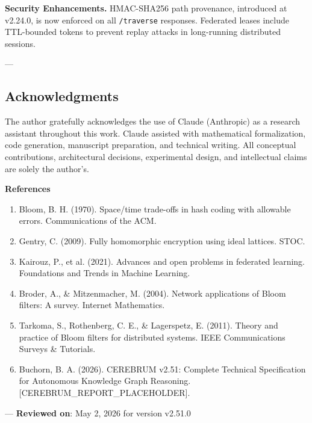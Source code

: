 \textbf{Security Enhanc\-ements.} HMAC-SHA256 path provenance, introduced at v2.24.0, is now enforced on all \texttt{/traverse} responses. Federated leases include TTL-bounded tokens to prevent replay attacks in long-running distributed sessions.

---
\subsection{Acknow\-ledgments}

The author gratefully ackno\-wledges the use of Claude (Anthropic) as a research assistant throughout this work. Claude assisted with mathe\-matical forma\-lization, code generation, manuscript preparation, and technical writing. All conceptual contr\-ibutions, archi\-tectural decisions, exper\-imental design, and intel\-lectual claims are solely the author's.

\textbf{References}
\begin{enumerate}
\item Bloom, B. H. (1970). Space/time trade-offs in hash coding with allowable errors. Commun\-ications of the ACM.
\item Gentry, C. (2009). Fully homomorphic encryption using ideal lattices. STOC.
\item Kairouz, P., et al. (2021). Advances and open problems in federated learning. Foundations and Trends in Machine Learning.
\item Broder, A., \& Mitzen\-macher, M. (2004). Network appli\-cations of Bloom filters: A survey. Internet Mathematics.
\item Tarkoma, S., Rothenberg, C. E., \& Lagerspetz, E. (2011). Theory and practice of Bloom filters for distributed systems. IEEE Commun\-ications Surveys \& Tutorials.
\item Buchorn, B. A. (2026). CEREBRUM v2.51: Complete Technical Specif\-ication for Autonomous Knowledge Graph Reasoning. [CEREBRUM\_REPORT\_PLACEHOLDER].

\end{enumerate}
---
\textbf{Reviewed on}: May 2, 2026 for version v2.51.0
